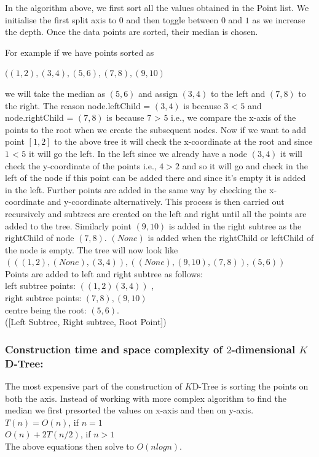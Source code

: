 In the algorithm above, we first sort all the values obtained in the Point list. We initialise the first split axis to $0$ and then toggle between $0$ and $1$ as we increase the depth. Once the data points are sorted, their median is chosen. 
\begin{mscexample}
    For example if we have points sorted as 

                $((1,2),(3,4),(5,6),(7,8),(9,10)$
    
    we will take the median as $(5,6)$ and assign $(3,4)$ to the left and $(7,8)$ to the right. The reason node.leftChild = $(3,4)$ is because $3$ < $5$ and node.rightChild = $(7,8)$ is because $7$ > $5$ i.e., we compare the x-axis of the points to the root when we create the subsequent nodes. Now if we want to add point $[1,2]$ to the above tree it will check the x-coordinate at the root and since $1$ < $5$ it will go the left. In the left since we already have a node $(3,4)$ it will check the y-coordinate of the points i.e., $4>2$ and so it will go and check in the left of the node if this point can be added there and since it's empty it is added in the left. Further points are added in the same way by checking the x-coordinate and y-coordinate alternatively. This process is then carried out recursively and subtrees are created on the left and right until all the points are added to the tree. Similarly point $(9,10)$ is added in the right subtree as the rightChild of
    node $(7,8)$. $(None)$ is added when the rightChild or leftChild of the node is empty. The tree will now look like\\

    $(((1,2),(None),(3,4)),((None),(9,10),(7,8)),(5,6))$\\

    Points are added to left and right subtree as follows:\\
    left subtree points: $((1,2)(3,4))$ ,\\
    right subtree points: $(7,8),(9,10)$ \\ 
    centre being the root: $(5,6)$. \\
    ([Left Subtree, Right subtree, Root Point])
\end{mscexample}
\subsubsection{Construction time and space complexity of $2$-dimensional $K$D-Tree:}

The most expensive part of the construction of $K$D-Tree is sorting the points on both the axis. Instead of working with more complex algorithm to find the median we first presorted the values on x-axis and then on y-axis.\\
$T(n) = O(n)$, if $n = 1$\\
$O(n) + 2T(n/2)$, if $n > 1$\\
The above equations then solve to $O( n log n)$.\\

